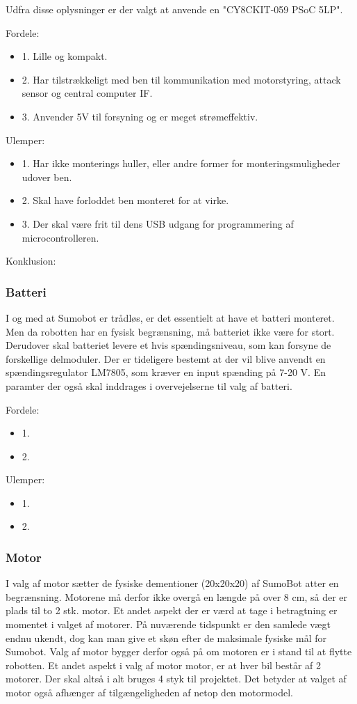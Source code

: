 Udfra disse oplysninger er der valgt at anvende en "CY8CKIT-059 PSoC 5LP". 

Fordele: 
\begin{itemize}
\item 1. Lille og kompakt.
\item 2. Har tilstrækkeligt med ben til kommunikation med motorstyring, attack sensor og central computer IF.
\item 3. Anvender 5V til forsyning og er meget strømeffektiv.
\end{itemize}

Ulemper: 
\begin{itemize}
\item 1. Har ikke monterings huller, eller andre former for monteringsmuligheder udover ben.
\item 2. Skal have forloddet ben monteret for at virke.
\item 3. Der skal være frit til dens USB udgang for programmering af microcontrolleren. 
\end{itemize}

Konklusion:


\subsubsection*{\textbf{Batteri}}
I og med at Sumobot er trådløs, er det essentielt at have et batteri monteret. Men da robotten har en fysisk begrænsning, må batteriet ikke være for stort. Derudover skal batteriet levere et hvis spændingsniveau, som kan forsyne de forskellige delmoduler.
Der er tideligere bestemt at der vil blive anvendt en spændingsregulator LM7805, som kræver en input spænding på 7-20 V. En paramter der også skal inddrages i overvejelserne til valg af batteri.

Fordele: 
\begin{itemize}
\item 1.
\item 2.
\end{itemize}

Ulemper: 
\begin{itemize}
\item 1.
\item 2.
\end{itemize}


\subsubsection*{\textbf{Motor}}
I valg af motor sætter de fysiske dementioner (20x20x20) af SumoBot atter en begrænsning. Motorene må derfor ikke overgå en længde på over 8 cm, så der er plads til to 2 stk. motor. Et andet aspekt der er værd at tage i betragtning er momentet i valget af motorer. På nuværende tidspunkt er den samlede vægt endnu ukendt, dog kan man give et skøn  efter de maksimale fysiske mål for Sumobot. Valg af motor bygger derfor også på om motoren er i stand til at flytte robotten.
Et andet aspekt i valg af motor motor, er at hver bil består af 2 motorer. Der skal altså i alt bruges 4 styk til projektet. Det betyder at valget af motor også afhænger af tilgængeligheden af netop den motormodel. \tbd

